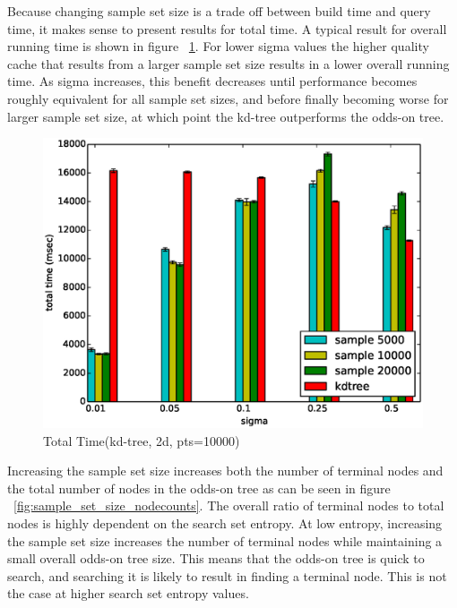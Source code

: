 \documentclass[mcs]{scsthesis}
\begin{document}
Because changing sample set size is a trade off between build time and query
time, it makes sense to present results for total time. A typical result for
overall running time is shown in figure ~\ref{fig:sample_set_size_total}. For
lower sigma values the higher quality cache that results from a larger sample
set size results in a lower overall running time. As sigma increases, this
benefit decreases until performance becomes roughly equivalent for all sample
set sizes, and before finally becoming worse for larger sample set size, at
which point the kd-tree outperforms the odds-on tree.

\begin{figure}
\begin{center}
\includegraphics[scale=0.5]{diagrams/kt_2d_pts10000_groupbysample_total.eps}
\caption{Total Time(kd-tree, 2d, pts=10000)}
\label{fig:sample_set_size_total}
\end{center}
\end{figure}

Increasing the sample set size increases both the number of terminal nodes and
the total number of nodes in the odds-on tree as can be seen in figure
~\ref{fig:sample_set_size_nodecounts}. The overall ratio of terminal nodes to
total nodes is highly dependent on the search set entropy. At low entropy,
increasing the sample set size increases the number of terminal nodes while
maintaining a small overall odds-on tree size. This means that the odds-on
tree is quick to search, and searching it is likely to result in finding a
terminal node. This is not the case at higher search set entropy values.
\end{document}
